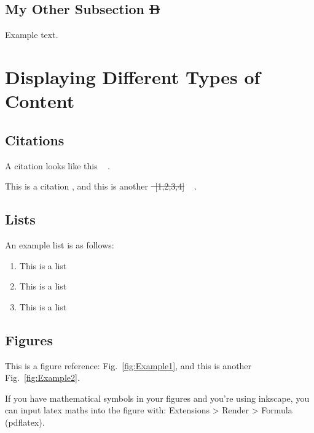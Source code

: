 \documentclass[preprint,3p,11pt,sort]{elsarticle}
\makeatletter
\newcommand{\figref}[1]{Fig.~\ref{#1}}
\providecommand{\DIFaddtex}[1]{{\protect\color{difBlue}#1}} %
\providecommand{\DIFdeltex}[1]{{\protect\color{difRed}\sout{#1}}} %
\providecommand{\DIFadd}[1]{\texorpdfstring{\DIFaddtex{#1}}{#1}} %
\providecommand{\DIFdel}[1]{\texorpdfstring{\DIFdeltex{#1}}{}} %
\let\sout@orig\sout %
\renewcommand{\sout}[1]{\ifmmode\text{\sout@orig{\ensuremath{#1}}}\else\sout@orig{#1}\fi} %
\makeatother
\begin{document}
\subsection{My  \DIFadd{Other } Subsection \DIFdel{B} } \label{ssec:mySubsectionB}
Example text.


\section{Displaying Different Types of Content} \label{sec:ContentTypes}


\subsection{Citations}
 \DIFadd{A citation looks like this \mbox{%
\cite{example2}}\hskip0pt%
.
}

 This is a citation \cite{example1}, and this is another  \DIFdel{\mbox{%
[1,2,3,4]}\hskip0pt%
}  \DIFadd{\mbox{%
\cite{example1,example2,example3,example5}}\hskip0pt%
} .


\subsection{Lists}
An example list is as follows:

\begin{enumerate}
    \item This is a list
    \item This is a list
    \item This is a list
\end{enumerate}


\subsection{Figures}
This is a figure reference: \figref{fig:Example1}, and this is another \figref{fig:Example2}.

If you have mathematical symbols in your figures and you're using inkscape, you can input latex maths into the figure with: Extensions > Render > Formula (pdflatex).
\end{document}
